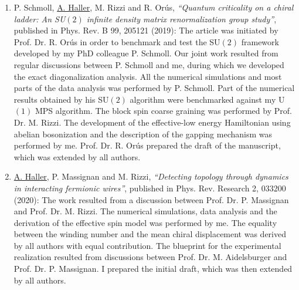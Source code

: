 \begin{enumerate}
    \item{P. Schmoll, \underline{A. Haller}, M. Rizzi and R. Orús, {\it ``Quantum criticality on a chiral ladder: An SU$(2)$ infinite density matrix renormalization group study''}, published in Phys. Rev. B 99, 205121 (2019):
    The article was initiated by Prof. Dr. R. Orús in order to benchmark and test the SU$(2)$ framework developed by my PhD colleague P. Schmoll. Our joint work resulted from regular discussions between P. Schmoll and me, during which we developed the exact diagonalization analysis. All the numerical simulations and most parts of the data analysis was performed by P. Schmoll. Part of the numerical results obtained by his SU$(2)$ algorithm were benchmarked against my U$(1)$ MPS algorithm. The block spin coarse graining was performed by Prof. Dr. M. Rizzi. The development of the effective-low energy Hamiltonian using abelian bosonization and the description of the gapping mechanism was performed by me. Prof. Dr. R. Orús prepared the draft of the manuscript, which was extended by all authors.}
    \item{\underline{A. Haller}, P. Massignan and M. Rizzi, {\it ``Detecting topology through dynamics in interacting fermionic wires''}, published in Phys. Rev. Research 2, 033200 (2020):
    The work resulted from a discussion between Prof. Dr. P. Massignan and Prof. Dr. M. Rizzi. The numerical simulations, data analysis and the derivation of the effective spin model was performed by me. The equality between the winding number and the mean chiral displacement was derived by all authors with equal contribution. The blueprint for the experimental realization resulted from discussions between Prof. Dr. M. Aidelsburger and Prof. Dr. P. Massignan. I prepared the initial draft, which was then extended by all authors.}
\end{enumerate}





